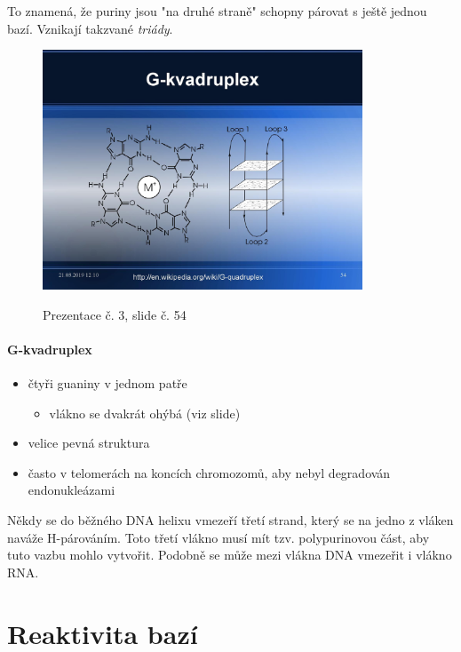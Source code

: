 \documentclass[DIV=8]{scrreprt}
\begin{document}
To znamená, že puriny jsou "na druhé straně" schopny párovat s ještě jednou bazí. Vznikají takzvané \emph{triády}.

\begin{figure}
    \caption{Prezentace č. 3, slide č. 54}
    \includegraphics[width=0.85\textwidth]{slides-3/slide-54.jpg}
    \centering
    \label{slides-3-slide-54}
\end{figure}

\paragraph{G-kvadruplex}
\begin{itemize}[nosep]
    \item čtyři guaniny v jednom patře
\begin{itemize}[nosep]
    \item vlákno se dvakrát ohýbá (viz slide)
\end{itemize}

    \item velice pevná struktura
    \item často v telomerách na koncích chromozomů, aby nebyl degradován endonukleázami
\end{itemize}



Někdy se do běžného DNA helixu vmezeří třetí strand, který se na jedno z vláken naváže H-párováním. Toto třetí vlákno musí mít tzv. polypurinovou část, aby tuto vazbu mohlo vytvořit. Podobně se může mezi vlákna DNA vmezeřit i vlákno RNA.

\section{Reaktivita bazí} \label{Reaktivita bazí}
\end{document}
